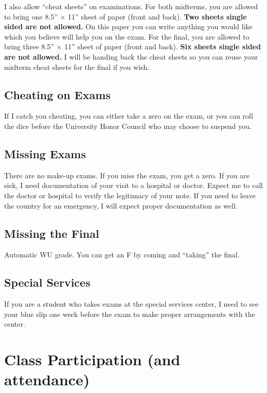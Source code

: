 \documentclass[12pt]{article}
\newcommand{\inred}[1]{\color{red}\textbf{#1} \color{black}}
\newcommand{\qu}[1]{``#1''}
\begin{document}
I also allow \qu{cheat sheets} on examinations. For both midterms, you are allowed to bring one 8.5'' $\times$ 11'' sheet of paper (front and back). \inred{Two sheets single sided are not allowed.} On this paper you can write anything you would like which you believe will help you on the exam. For the final, you are allowed to bring three 8.5'' $\times$ 11'' sheet of paper (front and back). \inred{Six sheets single sided are not allowed.} I will be handing back the cheat sheets so you can reuse your midterm cheat sheets for the final if you wish. 

\subsection*{Cheating on Exams}

If I catch you cheating, you can either take a zero on the exam, or you can roll the dice before the University Honor Council who may choose to suspend you.


\subsection*{Missing Exams}

There are no make-up exams. If you miss the exam, you get a zero. If you are sick, I need documentation of your visit to a hospital or doctor. Expect me to call the doctor or hospital to verify the legitimacy of your note. If you need to leave the country for an emergency, I will expect proper documentation as well.


\subsection*{Missing the Final}

Automatic WU grade. You can get an F by coming and \qu{taking} the final.

\subsection*{Special Services}

If you are a student who takes exams at the special services center, I need to see your blue slip one week before the exam to make proper arrangements with the center.

\section*{Class Participation (and attendance)}
\end{document}
